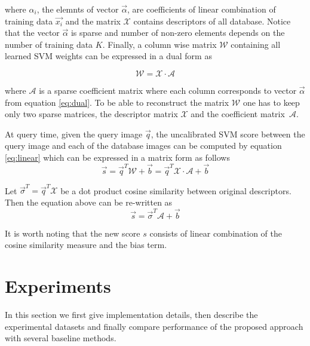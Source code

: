       \noindent
      where $\alpha_i$, the elemnts of vector $\vec{\alpha}$, are coefficients of linear combination of training data $\vec{x_i}$ and the matrix $\mathcal{X}$ contains descriptors of all database. Notice that the vector $\vec{\alpha}$ is sparse and number of non-zero elements depends on the number of training data $K$. Finally, a column wise matrix $\mathcal{W}$ containing all learned SVM weights can be expressed in a dual form as

      \begin{equation}
        \mathcal{W} = \mathcal{X}\cdot \mathcal{A}  
      \end{equation}

      \noindent
      where $\mathcal{A}$ is a sparse coefficient matrix where each column corresponds to vector $\vec{\alpha}$ from equation \eqref{eq:dual}. To be able to reconstruct the matrix $\mathcal{W}$ one has to keep only two sparse matrices, the descriptor matrix $\mathcal{X}$ and the coefficient matrix~$\mathcal{A}$.

      At query time, given the query image $\vec{q}$, the uncalibrated SVM score between the query image and each of the database images can be computed by equation \eqref{eq:linear} which can be expressed in a matrix form as follows
      \begin{equation}
        \vec{s}=\vec{q}^T \mathcal{W}+\vec{b}=\vec{q}^T \mathcal{X}\cdot \mathcal{A}+\vec{b}
      \end{equation}

      Let $\vec{\sigma}^T=\vec{q}^T \mathcal{X}$ be a dot product cosine similarity between original descriptors. Then the equation above can be re-written as
      \begin{equation}
        \vec{s}=\vec{\sigma}^T \mathcal{A}+\vec{b}
      \end{equation}

      \noindent
      It is worth noting that the new score $s$ consists of linear combination of the cosine similarity measure and the bias term.


\section{Experiments}
\label{sec:experiments}
   In this section we first give implementation details, then describe the experimental datasets and finally compare performance of the proposed approach with several baseline methods.
